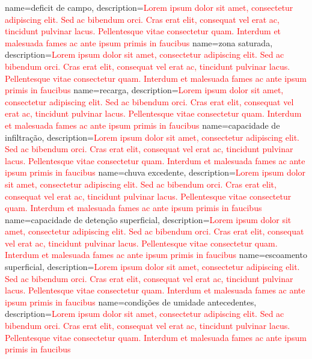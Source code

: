 {
    name=deficit de campo,
    description={\textcolor{red}{Lorem ipsum dolor sit amet, consectetur adipiscing elit. Sed ac bibendum orci. Cras erat elit, consequat vel erat ac, tincidunt pulvinar lacus. Pellentesque vitae consectetur quam. Interdum et malesuada fames ac ante ipsum primis in faucibus}}
}
{
    name=zona saturada,
    description={\textcolor{red}{Lorem ipsum dolor sit amet, consectetur adipiscing elit. Sed ac bibendum orci. Cras erat elit, consequat vel erat ac, tincidunt pulvinar lacus. Pellentesque vitae consectetur quam. Interdum et malesuada fames ac ante ipsum primis in faucibus}}
}
{
    name=recarga,
    description={\textcolor{red}{Lorem ipsum dolor sit amet, consectetur adipiscing elit. Sed ac bibendum orci. Cras erat elit, consequat vel erat ac, tincidunt pulvinar lacus. Pellentesque vitae consectetur quam. Interdum et malesuada fames ac ante ipsum primis in faucibus}}
}
{
    name=capacidade de infiltração,
    description={\textcolor{red}{Lorem ipsum dolor sit amet, consectetur adipiscing elit. Sed ac bibendum orci. Cras erat elit, consequat vel erat ac, tincidunt pulvinar lacus. Pellentesque vitae consectetur quam. Interdum et malesuada fames ac ante ipsum primis in faucibus}}
}
{
    name=chuva excedente,
    description={\textcolor{red}{Lorem ipsum dolor sit amet, consectetur adipiscing elit. Sed ac bibendum orci. Cras erat elit, consequat vel erat ac, tincidunt pulvinar lacus. Pellentesque vitae consectetur quam. Interdum et malesuada fames ac ante ipsum primis in faucibus}}
}
{
    name=capacidade de detenção superficial,
    description={\textcolor{red}{Lorem ipsum dolor sit amet, consectetur adipiscing elit. Sed ac bibendum orci. Cras erat elit, consequat vel erat ac, tincidunt pulvinar lacus. Pellentesque vitae consectetur quam. Interdum et malesuada fames ac ante ipsum primis in faucibus}}
}
{
    name=escoamento superficial,
    description={\textcolor{red}{Lorem ipsum dolor sit amet, consectetur adipiscing elit. Sed ac bibendum orci. Cras erat elit, consequat vel erat ac, tincidunt pulvinar lacus. Pellentesque vitae consectetur quam. Interdum et malesuada fames ac ante ipsum primis in faucibus}}
}
{
    name=condições de umidade antecedentes,
    description={\textcolor{red}{Lorem ipsum dolor sit amet, consectetur adipiscing elit. Sed ac bibendum orci. Cras erat elit, consequat vel erat ac, tincidunt pulvinar lacus. Pellentesque vitae consectetur quam. Interdum et malesuada fames ac ante ipsum primis in faucibus}}
}
